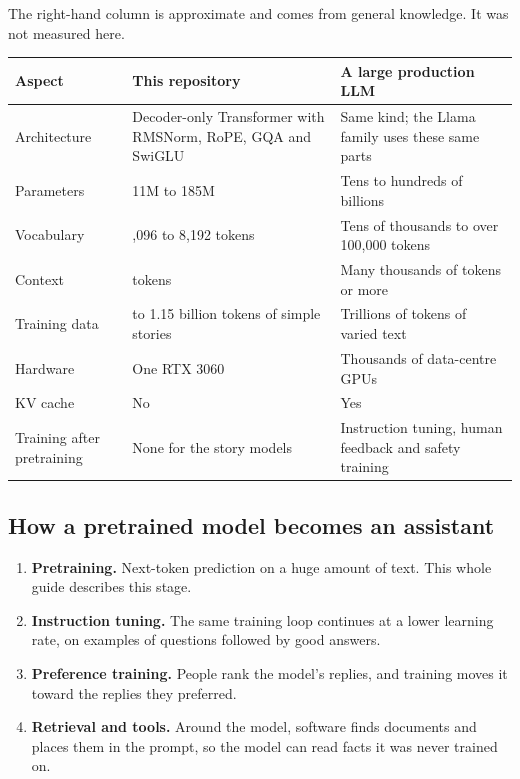 \documentclass[11pt,a4paper]{article}
\begin{document}
The right-hand column is approximate and comes from general knowledge. It was not measured here.

{\small
\begin{longtable}{@{}>{\raggedright\arraybackslash}p{}>{\raggedright\arraybackslash}p{}>{\raggedright\arraybackslash}p{}@{}}
\toprule
\textbf{Aspect} & \textbf{This repository} & \textbf{A large production LLM} \\
\midrule
\endhead
Architecture & Decoder-only Transformer with RMSNorm, RoPE, GQA and SwiGLU & Same kind; the Llama family uses these same parts \\
Parameters & 11M to 185M & Tens to hundreds of billions \\
Vocabulary & 4,096 to 8,192 tokens & Tens of thousands to over 100,000 tokens \\
Context & 768 tokens & Many thousands of tokens or more \\
Training data & 0.56 to 1.15 billion tokens of simple stories & Trillions of tokens of varied text \\
Hardware & One RTX 3060 & Thousands of data-centre GPUs \\
KV cache & No & Yes \\
Training after pretraining & None for the story models & Instruction tuning, human feedback and safety training \\
\bottomrule
\end{longtable}
}

\subsection*{How a pretrained model becomes an assistant}
{}

\begin{enumerate}
\item \textbf{Pretraining.} Next-token prediction on a huge amount of text. This whole guide describes this stage.
\item \textbf{Instruction tuning.} The same training loop continues at a lower learning rate, on examples of questions followed by good answers.
\item \textbf{Preference training.} People rank the model's replies, and training moves it toward the replies they preferred.
\item \textbf{Retrieval and tools.} Around the model, software finds documents and places them in the prompt, so the model can read facts it was never trained on.
\end{enumerate}
\end{document}
